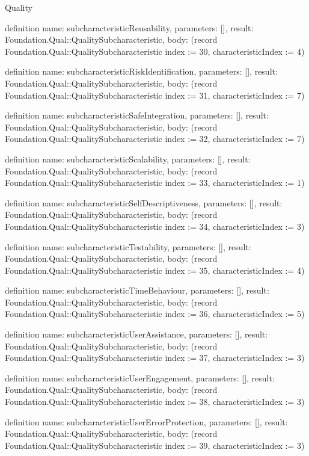 \begin{lexlean}{Quality}
\begin{semanticmodule}
definition{
  name: subcharacteristicReusability,
  parameters: [],
  result: Foundation.Qual::QualitySubcharacteristic,
  body: (record Foundation.Qual::QualitySubcharacteristic {index := 30, characteristicIndex := 4})
}

definition{
  name: subcharacteristicRiskIdentification,
  parameters: [],
  result: Foundation.Qual::QualitySubcharacteristic,
  body: (record Foundation.Qual::QualitySubcharacteristic {index := 31, characteristicIndex := 7})
}

definition{
  name: subcharacteristicSafeIntegration,
  parameters: [],
  result: Foundation.Qual::QualitySubcharacteristic,
  body: (record Foundation.Qual::QualitySubcharacteristic {index := 32, characteristicIndex := 7})
}

definition{
  name: subcharacteristicScalability,
  parameters: [],
  result: Foundation.Qual::QualitySubcharacteristic,
  body: (record Foundation.Qual::QualitySubcharacteristic {index := 33, characteristicIndex := 1})
}

definition{
  name: subcharacteristicSelfDescriptiveness,
  parameters: [],
  result: Foundation.Qual::QualitySubcharacteristic,
  body: (record Foundation.Qual::QualitySubcharacteristic {index := 34, characteristicIndex := 3})
}

definition{
  name: subcharacteristicTestability,
  parameters: [],
  result: Foundation.Qual::QualitySubcharacteristic,
  body: (record Foundation.Qual::QualitySubcharacteristic {index := 35, characteristicIndex := 4})
}

definition{
  name: subcharacteristicTimeBehaviour,
  parameters: [],
  result: Foundation.Qual::QualitySubcharacteristic,
  body: (record Foundation.Qual::QualitySubcharacteristic {index := 36, characteristicIndex := 5})
}

definition{
  name: subcharacteristicUserAssistance,
  parameters: [],
  result: Foundation.Qual::QualitySubcharacteristic,
  body: (record Foundation.Qual::QualitySubcharacteristic {index := 37, characteristicIndex := 3})
}

definition{
  name: subcharacteristicUserEngagement,
  parameters: [],
  result: Foundation.Qual::QualitySubcharacteristic,
  body: (record Foundation.Qual::QualitySubcharacteristic {index := 38, characteristicIndex := 3})
}

definition{
  name: subcharacteristicUserErrorProtection,
  parameters: [],
  result: Foundation.Qual::QualitySubcharacteristic,
  body: (record Foundation.Qual::QualitySubcharacteristic {index := 39, characteristicIndex := 3})
}


\end{semanticmodule}
\end{lexlean}
